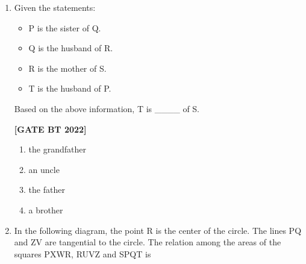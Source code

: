 \documentclass[12pt]{article}
\begin{document}
\begin{enumerate}[leftmargin=2.5em, label=\textbf{Q.\arabic*}., itemsep=2em]
\noindent \textbf{[GATE BT 2022]}
\begin{multicols}{2}
\begin{enumerate}
    \item 2:15
    \item 16:15
    \item 1:5
    \item 16:45
\end{enumerate}
\end{multicols}

\item Given the statements:  
\begin{itemize}
    \item P is the sister of Q.  
    \item Q is the husband of R.  
    \item R is the mother of S.  
    \item T is the husband of P.  
\end{itemize}
Based on the above information, T is \_\_\_\_ of S.

\noindent \textbf{[GATE BT 2022]}
\begin{multicols}{2}
\begin{enumerate}
    \item the grandfather
    \item an uncle
    \item the father
    \item a brother
\end{enumerate}
\end{multicols}

\item In the following diagram, the point R is the center of the circle. The lines PQ and ZV are tangential to the circle. The relation among the areas of the squares PXWR, RUVZ and SPQT is


\end{enumerate}
\end{document}
